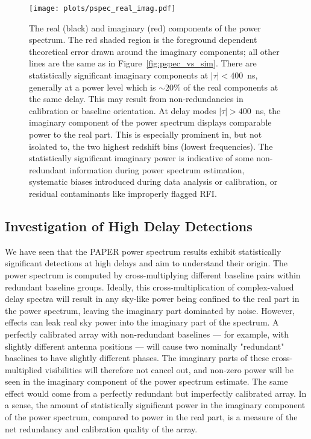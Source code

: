 \begin{figure}[tp]
\centering
\texttt{[image: plots/pspec\_real\_imag.pdf]}
\caption{The real (black) and imaginary (red) components of the
power spectrum. The red shaded region is the 
foreground dependent theoretical error drawn around the 
imaginary components; all other lines are the same as in Figure~\ref{fig:pspec_vs_sim}. There are statistically significant imaginary components at
$ |\tau| < 400 $~ns, generally at a power level
which is $ \sim 20\% $ of the real components at the same delay.
This may result from non-redundancies in calibration or baseline orientation. At delay modes $ |\tau| > 400 $~ns, the imaginary
component of the power spectrum displays comparable power to the 
real part. This is especially prominent in, but not isolated to, the two highest redshift bins (lowest frequencies). The statistically significant imaginary power is indicative of some non-redundant information 
during power spectrum estimation, systematic biases introduced during data analysis or calibration, 
or residual contaminants like improperly flagged RFI.
}
\label{fig:real_imag}
\end{figure}

\subsection{Investigation of High Delay Detections}

We have seen that the PAPER power spectrum results exhibit statistically significant detections at high delays and aim to understand their origin. The power spectrum is computed by cross-multiplying
different baseline pairs within redundant baseline groups.
Ideally, this cross-multiplication of complex-valued
delay spectra will result in any sky-like power being confined to the real part in the power spectrum, leaving the imaginary part dominated by noise.
However, effects can leak real sky power into the
imaginary part of the spectrum.
A perfectly calibrated array with non-redundant baselines
--- for example, with slightly different antenna positions ---
will cause two nominally "redundant" baselines to have slightly different phases.
The imaginary parts of these cross-multiplied visibilities will therefore not cancel out, and non-zero power will be seen in the imaginary component of the power spectrum estimate.
The same effect would come from a perfectly redundant but imperfectly calibrated array.
In a sense, the amount of statistically significant power in the imaginary component of the power spectrum, compared to power in the real part, is a measure of the net redundancy and calibration quality of the array.


